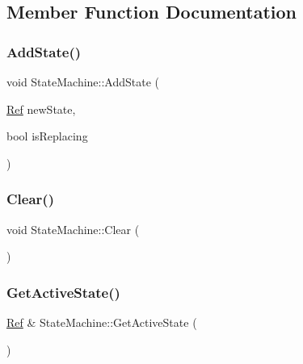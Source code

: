 \subsection{Member Function Documentation}
\mbox{\label{classStateMachine_a7814392717303d669b6d19f074f180da}} 
\subsubsection{\texorpdfstring{Add\+State()}{AddState()}}
{\footnotesize\ttfamily void State\+Machine\+::\+Add\+State (\begin{DoxyParamCaption}\item[{\hyperlink{state__machine_8h_a6052c67656ab2e47e32df9051a84e8f4}{Ref}}]{new\+State,  }\item[{bool}]{is\+Replacing }\end{DoxyParamCaption})}

\mbox{\label{classStateMachine_a7821c514a1e468c7fa891f2b5f5d102c}} 
\subsubsection{\texorpdfstring{Clear()}{Clear()}}
{\footnotesize\ttfamily void State\+Machine\+::\+Clear (\begin{DoxyParamCaption}{ }\end{DoxyParamCaption})}

\mbox{\label{classStateMachine_a78bf24ece9baf3877ee9e3eec47ac4cc}} 
\subsubsection{\texorpdfstring{Get\+Active\+State()}{GetActiveState()}}
{\footnotesize\ttfamily \hyperlink{state__machine_8h_a6052c67656ab2e47e32df9051a84e8f4}{Ref} \& State\+Machine\+::\+Get\+Active\+State (\begin{DoxyParamCaption}{ }\end{DoxyParamCaption})}

